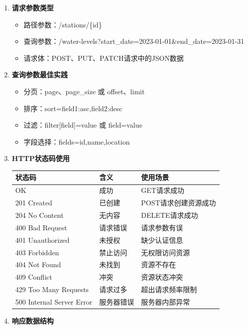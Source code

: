 \begin{enumerate}
\def\labelenumi{\arabic{enumi}.}
\item
  \textbf{请求参数类型}

  \begin{itemize}
  \tightlist
  \item
    路径参数：/stations/\{id\}
  \item
    查询参数：/water-levels?start\_date=2023-01-01\&end\_date=2023-01-31
  \item
    请求体：POST、PUT、PATCH请求中的JSON数据
  \end{itemize}
\item
  \textbf{查询参数最佳实践}

  \begin{itemize}
  \tightlist
  \item
    分页：page、page\_size 或 offset、limit
  \item
    排序：sort=field1:asc,field2:desc
  \item
    过滤：filter{[}field{]}=value 或 field=value
  \item
    字段选择：fields=id,name,location
  \end{itemize}
\item
  \textbf{HTTP状态码使用}

  \begin{longtable}[]{@{}lll@{}}
  \toprule\noalign{}
  状态码 & 含义 & 使用场景 \\
  \midrule\noalign{}
  \endhead
  \bottomrule\noalign{}
  \endlastfoot
  200 OK & 成功 & GET请求成功 \\
  201 Created & 已创建 & POST请求创建资源成功 \\
  204 No Content & 无内容 & DELETE请求成功 \\
  400 Bad Request & 请求错误 & 请求参数有误 \\
  401 Unauthorized & 未授权 & 缺少认证信息 \\
  403 Forbidden & 禁止访问 & 无权限访问资源 \\
  404 Not Found & 未找到 & 资源不存在 \\
  409 Conflict & 冲突 & 资源状态冲突 \\
  429 Too Many Requests & 请求过多 & 超出请求频率限制 \\
  500 Internal Server Error & 服务器错误 & 服务器内部异常 \\
  \end{longtable}
\item
  \textbf{响应数据结构}


\end{enumerate}

